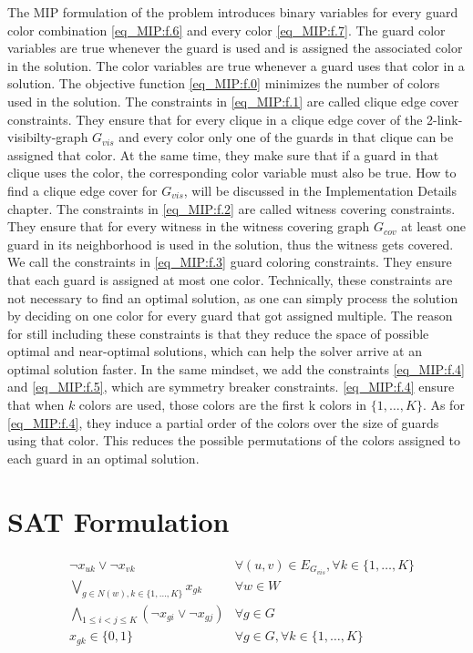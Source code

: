 The MIP formulation of the problem introduces binary variables for every guard color combination \cref{eq_MIP:f.6} and every color \cref{eq_MIP:f.7}. The guard color variables are true whenever the guard is used and is assigned the associated color in the solution. The color variables are true whenever a guard uses that color in a solution. The objective function \cref{eq_MIP:f.0} minimizes the number of colors used in the solution. The constraints in \cref{eq_MIP:f.1} are called clique edge cover constraints. They ensure that for every clique in a clique edge cover of the 2-link-visibilty-graph $G_{vis}$ and every color only one of the guards in that clique can be assigned that color. At the same time, they make sure that if a guard in that clique uses the color, the corresponding color variable must also be true. How to find a clique edge cover for $G_{vis}$, will be discussed in the Implementation Details chapter. The constraints in \cref{eq_MIP:f.2} are called witness covering constraints. They ensure that for every witness in the witness covering graph $G_{cov}$ at least one guard in its neighborhood is used in the solution, thus the witness gets covered. We call the constraints in \cref{eq_MIP:f.3} guard coloring constraints. They ensure that each guard is assigned at most one color. Technically, these constraints are not necessary to find an optimal solution, as one can simply process the solution by deciding on one color for every guard that got assigned multiple. The reason for still including these constraints is that they reduce the space of possible optimal and near-optimal solutions, which can help the solver arrive at an optimal solution faster. In the same mindset, we add the constraints \cref{eq_MIP:f.4} and \cref{eq_MIP:f.5}, which are symmetry breaker constraints. \cref{eq_MIP:f.4} ensure that when $k$ colors are used, those colors are the first k colors in $\{1,\ldots,K\}$. As for \cref{eq_MIP:f.4}, they induce a partial order of the colors over the size of guards using that color. This reduces the possible permutations of the colors assigned to each guard in an optimal solution.

\section{SAT Formulation}

\begin{align}
\label{eq_SAT:f.0}&\lnot x_{uk} \lor \lnot x_{vk} & \forall (u,v)\in E_{G_{vis}}, \forall k\in \{1,\ldots,K\}\\
\label{eq_SAT:f.1}&\bigvee_{g\in N(w), k\in \{1,\ldots,K\}}x_{gk} & \forall w\in W\\
\label{eq_SAT:f.2}&\bigwedge_{1 \leq i < j \leq K} (\lnot x_{gi} \lor \lnot x_{gj}) & \forall g\in G\\
\label{eq_SAT:f.3}& x_{gk} \in \{0,1\} & \forall g\in G, \forall k\in \{1,\ldots,K\}
\end{align}

